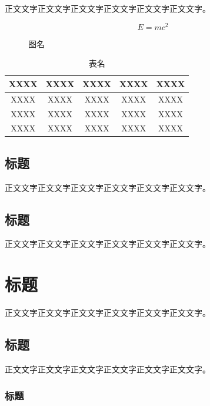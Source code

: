 \documentclass[a4paper,12pt]{ctexart}
\begin{document}
正文文字正文文字正文文字正文文字正文文字正文文字。

\begin{equation}
E = mc^2 \label{eq:1-1}
\end{equation}

\begin{figure}[htbp]
\centering
\caption{图名}
\label{fig:1-1}
\end{figure}

\begin{table}[htbp]
\centering
\caption{表名}
\label{tab:1-1}
\begin{tabular}{ccccc}
\toprule
XXXX & XXXX & XXXX & XXXX & XXXX \\
\midrule
XXXX & XXXX & XXXX & XXXX & XXXX \\
XXXX & XXXX & XXXX & XXXX & XXXX \\
XXXX & XXXX & XXXX & XXXX & XXXX \\
\bottomrule
\end{tabular}
\end{table}

\subsection{标题}

正文文字正文文字正文文字正文文字正文文字正文文字。

\subsection{标题}

正文文字正文文字正文文字正文文字正文文字正文文字。

\section{标题}

正文文字正文文字正文文字正文文字正文文字正文文字。

\subsection{标题}

正文文字正文文字正文文字正文文字正文文字正文文字。

\subsubsection{标题}
\end{document}
